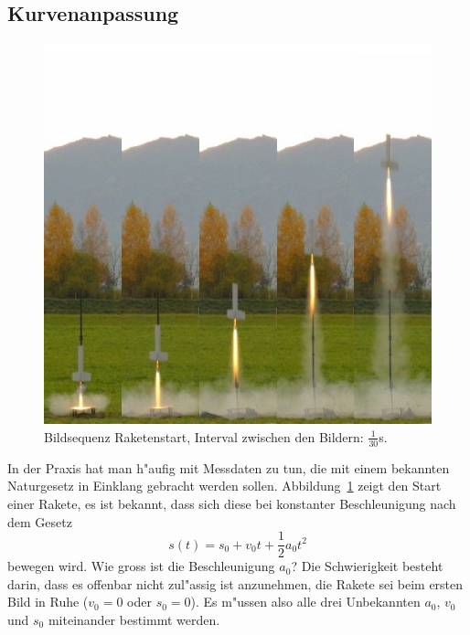 %
%
\subsection{Kurvenanpassung}
\begin{figure}
\begin{center}
\includegraphics[width=0.6\hsize]{graphics/stummel}
\end{center}
\caption{Bildsequenz Raketenstart, Interval zwischen den Bildern: $\frac1{30}$s.
\label{stummel}}
\end{figure}
In der Praxis hat man h"aufig mit Messdaten zu tun, die mit einem
bekannten Naturgesetz in Einklang gebracht werden sollen.
Abbildung~\ref{stummel} zeigt den Start einer Rakete, es ist
bekannt, dass sich diese bei konstanter Beschleunigung nach dem
Gesetz
\[
s(t)=s_0+v_0t+\frac12a_0t^2
\]
bewegen wird. Wie gross ist die Beschleunigung $a_0$?
Die Schwierigkeit besteht darin, dass es offenbar nicht zul"assig ist
anzunehmen, die Rakete sei beim ersten Bild in Ruhe ($v_0=0$ oder
$s_0=0$). Es m"ussen also alle drei Unbekannten $a_0$, $v_0$
und $s_0$ miteinander bestimmt werden.

